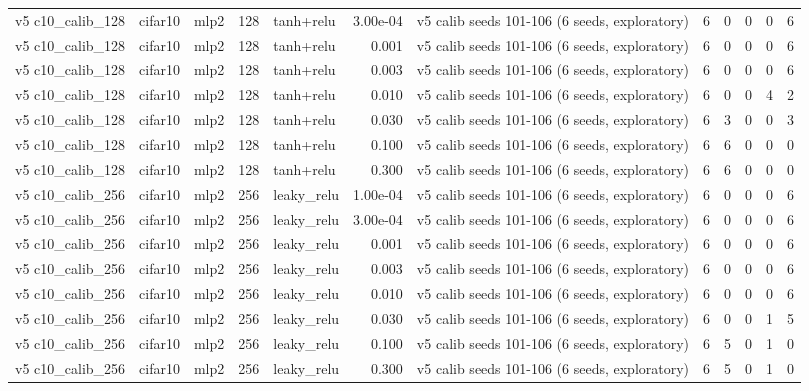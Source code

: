 \begin{table}[htbp]
{\begin{tabular}{@{}lllrlrlrrrrr@{}}
v5 c10\_calib\_128 & cifar10 & mlp2 & 128 & tanh+relu & 3.00e-04 & v5 calib seeds 101-106 (6 seeds, exploratory) & 6 & 0 & 0 & 0 & 6 \\
v5 c10\_calib\_128 & cifar10 & mlp2 & 128 & tanh+relu & 0.001 & v5 calib seeds 101-106 (6 seeds, exploratory) & 6 & 0 & 0 & 0 & 6 \\
v5 c10\_calib\_128 & cifar10 & mlp2 & 128 & tanh+relu & 0.003 & v5 calib seeds 101-106 (6 seeds, exploratory) & 6 & 0 & 0 & 0 & 6 \\
v5 c10\_calib\_128 & cifar10 & mlp2 & 128 & tanh+relu & 0.010 & v5 calib seeds 101-106 (6 seeds, exploratory) & 6 & 0 & 0 & 4 & 2 \\
v5 c10\_calib\_128 & cifar10 & mlp2 & 128 & tanh+relu & 0.030 & v5 calib seeds 101-106 (6 seeds, exploratory) & 6 & 3 & 0 & 0 & 3 \\
v5 c10\_calib\_128 & cifar10 & mlp2 & 128 & tanh+relu & 0.100 & v5 calib seeds 101-106 (6 seeds, exploratory) & 6 & 6 & 0 & 0 & 0 \\
v5 c10\_calib\_128 & cifar10 & mlp2 & 128 & tanh+relu & 0.300 & v5 calib seeds 101-106 (6 seeds, exploratory) & 6 & 6 & 0 & 0 & 0 \\
v5 c10\_calib\_256 & cifar10 & mlp2 & 256 & leaky\_relu & 1.00e-04 & v5 calib seeds 101-106 (6 seeds, exploratory) & 6 & 0 & 0 & 0 & 6 \\
v5 c10\_calib\_256 & cifar10 & mlp2 & 256 & leaky\_relu & 3.00e-04 & v5 calib seeds 101-106 (6 seeds, exploratory) & 6 & 0 & 0 & 0 & 6 \\
v5 c10\_calib\_256 & cifar10 & mlp2 & 256 & leaky\_relu & 0.001 & v5 calib seeds 101-106 (6 seeds, exploratory) & 6 & 0 & 0 & 0 & 6 \\
v5 c10\_calib\_256 & cifar10 & mlp2 & 256 & leaky\_relu & 0.003 & v5 calib seeds 101-106 (6 seeds, exploratory) & 6 & 0 & 0 & 0 & 6 \\
v5 c10\_calib\_256 & cifar10 & mlp2 & 256 & leaky\_relu & 0.010 & v5 calib seeds 101-106 (6 seeds, exploratory) & 6 & 0 & 0 & 0 & 6 \\
v5 c10\_calib\_256 & cifar10 & mlp2 & 256 & leaky\_relu & 0.030 & v5 calib seeds 101-106 (6 seeds, exploratory) & 6 & 0 & 0 & 1 & 5 \\
v5 c10\_calib\_256 & cifar10 & mlp2 & 256 & leaky\_relu & 0.100 & v5 calib seeds 101-106 (6 seeds, exploratory) & 6 & 5 & 0 & 1 & 0 \\
v5 c10\_calib\_256 & cifar10 & mlp2 & 256 & leaky\_relu & 0.300 & v5 calib seeds 101-106 (6 seeds, exploratory) & 6 & 5 & 0 & 1 & 0 \\

\end{tabular}}
\end{table}
